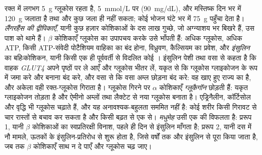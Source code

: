 \begin{definition}[इंसुलिन और ग्लूकैगॉन]\label{def:b3:endocrinology:glucose}
रक्त में लगभग \qty{5}{g} ग्लूकोस रहता है, \qty{5}{mmol/L} पर
(\qty{90}{mg/dL}), और मस्तिष्क दिन भर में \qty{120}{g} जलाता है तथा और
कुछ जला ही नहीं सकता; कोई भोजन घंटे भर में \qty{75}{g} पहुँचा देता है।
\emph{लैंगरहैंस की द्वीपिकाएँ}, यानी कुछ हज़ार कोशिकाओं के दस लाख
गुच्छे, जो अग्न्याशय भर बिखरे हैं, उस पाश को थामे हैं। $\beta$
कोशिकाएँ ग्लूकोस का उपापचय करके उसे भाँपती हैं: अधिक ग्लूकोस, अधिक ATP,
किसी ATP-संवेदी पोटैशियम वाहिका का बंद होना, विध्रुवण, कैल्सियम का
प्रवेश, और \emph{इंसुलिन} का बहिःकोशिकन, यानी किसी एक ही पूर्ववर्ती से
विदलित कोई । इंसुलिन पेशी तथा वसा से कहता है कि वाहक
\emph{GLUT4} अपने पृष्ठों पर ले आएँ और ग्लूकोस भीतर लें, यकृत से कि
ग्लूकोस ग्लाइकोजन के रूप में जमा करे और बनाना बंद करे, और वसा से कि
वसा अम्ल छोड़ना बंद करे: वह खाए हुए राज्य का  है, और अकेला वही
रक्त-ग्लूकोस गिराता है। ग्लूकोस गिरने पर $\alpha$ कोशिकाएँ
\emph{ग्लूकैगॉन} छोड़ती हैं: यकृत ग्लाइकोजन तोड़ता है और ऐमीनो अम्लों
तथा लैक्टेट से नया ग्लूकोस बनाता है। एड्रिनैलीन, कॉर्टिसोल और वृद्धि
 भी ग्लूकोस चढ़ाते हैं, और यह अनावश्यक-बहुलता सममित नहीं है:
कोई शरीर किसी गिरावट से चार रास्तों से बचाव कर सकता है और किसी बढ़त से
एक से। \emph{मधुमेह} उसी एक की विफलता है: प्ररूप 1, यानी $\beta$
कोशिकाओं का स्वप्रतिरक्षी विनाश, पहले ही दिन से इंसुलिन माँगता है;
प्ररूप 2, यानी दस में नौ मामले, ऊतकों के इंसुलिन-प्रतिरोध से शुरू होता
है, जिसे वर्षों तक और इंसुलिन से पूरा किया जाता है, जब तक $\beta$
कोशिकाएँ साथ न दे पाएँ और ग्लूकोस चढ़ जाए।
\end{definition}

